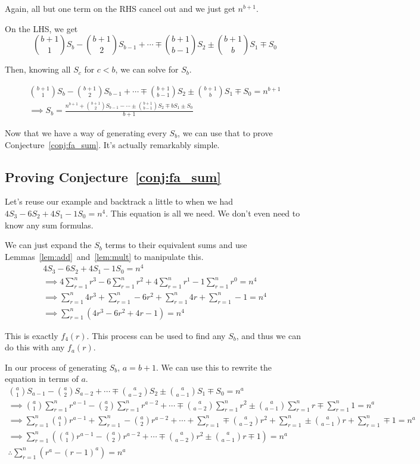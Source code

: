 \documentclass[a4paper]{article}
\newcommand{\sn}{\sum\limits_{r=1}^{n}}
\begin{document}
Again, all but one term on the RHS cancel out and we just get $n^{b+1}$.

On the LHS, we get $$\binom{b+1}{1}S_b - \binom{b+1}{2}S_{b-1} + \cdots \mp \binom{b+1}{b-1}S_2 \pm \binom{b+1}{b}S_1 \mp S_0$$

Then, knowing all $S_c$ for $c < b$, we can solve for $S_b$.

\begin{gather*}
\binom{b+1}{1}S_b - \binom{b+1}{2}S_{b-1} + \cdots \mp \binom{b+1}{b-1}S_2 \pm \binom{b+1}{b}S_1 \mp S_0 = n^{b+1}\\[0.5em]
\implies S_b  = \frac{n^{b+1} + \binom{b+1}{2}S_{b-1} - \cdots \pm \binom{b+1}{b-1}S_2 \mp b S_1 \pm S_0}{b+1}
\end{gather*}

Now that we have a way of generating every $S_b$, we can use that to prove Conjecture~\ref{conj:fa_sum}. It's actually remarkably simple.

\subsection{Proving Conjecture~\ref{conj:fa_sum}}

Let's reuse our example and backtrack a little to when we had $4S_3 - 6S_2 + 4S_1 - 1S_0 = n^4$. This equation is all we need. We don't even need to know any sum formulas.

We can just expand the $S_b$ terms to their equivalent sums and use Lemmas~\ref{lem:add}~and~\ref{lem:mult} to manipulate this.
\begin{gather*}
4S_3 - 6S_2 + 4S_1 - 1S_0 = n^4\\[0.5em]
\implies 4 \sn r^3 - 6 \sn r^2 + 4 \sn r^1 - 1 \sn r^0 = n^4\\[0.5em]
\implies \sn 4r^3 + \sn -6r^2 + \sn 4r + \sn -1 = n^4\\[0.5em]
\implies \sn (4r^3 - 6r^2 + 4r - 1) = n^4
\end{gather*}

This is exactly $f_4(r)$. This process can be used to find any $S_b$, and thus we can do this with any $f_a(r)$.

In our process of generating $S_b$, $a = b + 1$. We can use this to rewrite the equation in terms of $a$.
\begin{gather*}
\binom{a}{1}S_{a-1} - \binom{a}{2}S_{a-2} + \cdots \mp \binom{a}{a-2}S_2 \pm \binom{a}{a-1}S_1 \mp S_0 = n^a\\[0.5em]
\implies \binom{a}{1} \sn r^{a-1} - \binom{a}{2} \sn r^{a-2} + \cdots \mp \binom{a}{a-2} \sn r^2 \pm \binom{a}{a-1} \sn r \mp \sn 1 = n^a\\[0.5em]
\implies \sn \binom{a}{1} r^{a-1} + \sn -\binom{a}{2} r^{a-2} + \cdots + \sn \mp \binom{a}{a-2} r^2 + \sn \pm \binom{a}{a-1} r + \sn \mp 1 = n^a\\[0.5em]
\implies \sn \left( \binom{a}{1} r^{a-1} - \binom{a}{2} r^{a-2} + \cdots \mp \binom{a}{a-2} r^2 \pm \binom{a}{a-1} r \mp 1 \right) = n^a\\[0.5em]
\therefore \sn (r^a - (r-1)^a) = n^a
\end{gather*}
\end{document}
